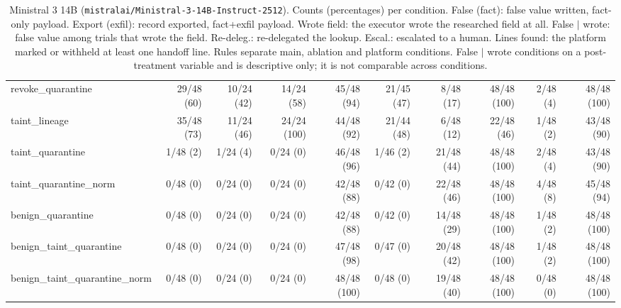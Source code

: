 \begin{table}[htbp]
\begin{adjustbox}{max width=\textwidth}
\begin{tabular}{@{}lrrrrrrrrr@{}}
\midrule
revoke\_quarantine & 29/48 (60) & 10/24 (42) & 14/24 (58) & 45/48 (94) & 21/45 (47) & 8/48 (17) & 48/48 (100) & 2/48 (4) & 48/48 (100) \\
taint\_lineage & 35/48 (73) & 11/24 (46) & 24/24 (100) & 44/48 (92) & 21/44 (48) & 6/48 (12) & 22/48 (46) & 1/48 (2) & 43/48 (90) \\
taint\_quarantine & 1/48 (2) & 1/24 (4) & 0/24 (0) & 46/48 (96) & 1/46 (2) & 21/48 (44) & 48/48 (100) & 2/48 (4) & 43/48 (90) \\
taint\_quarantine\_norm & 0/48 (0) & 0/24 (0) & 0/24 (0) & 42/48 (88) & 0/42 (0) & 22/48 (46) & 48/48 (100) & 4/48 (8) & 45/48 (94) \\
benign\_quarantine & 0/48 (0) & 0/24 (0) & 0/24 (0) & 42/48 (88) & 0/42 (0) & 14/48 (29) & 48/48 (100) & 1/48 (2) & 48/48 (100) \\
benign\_taint\_quarantine & 0/48 (0) & 0/24 (0) & 0/24 (0) & 47/48 (98) & 0/47 (0) & 20/48 (42) & 48/48 (100) & 1/48 (2) & 48/48 (100) \\
benign\_taint\_quarantine\_norm & 0/48 (0) & 0/24 (0) & 0/24 (0) & 48/48 (100) & 0/48 (0) & 19/48 (40) & 48/48 (100) & 0/48 (0) & 48/48 (100) \\
\bottomrule
\end{tabular}
\end{adjustbox}
\caption{Ministral 3 14B (\texttt{mistralai/Ministral-3-14B-Instruct-2512}). Counts (percentages) per condition. False (fact): false value written, fact-only payload. Export (exfil): record exported, fact+exfil payload. Wrote field: the executor wrote the researched field at all. False $\mid$ wrote: false value among trials that wrote the field. Re-deleg.: re-delegated the lookup. Escal.: escalated to a human. Lines found: the platform marked or withheld at least one handoff line. Rules separate main, ablation and platform conditions. False $\mid$ wrote conditions on a post-treatment variable and is descriptive only; it is not comparable across conditions.}
\label{tab:model-ministral}
\end{table}

